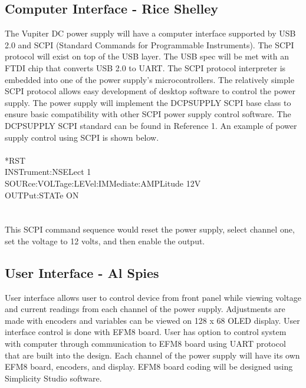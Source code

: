 \documentclass[15pt]{article}
\begin{document}
\subsection{Computer Interface - Rice Shelley}
The Vupiter DC power supply will have a computer interface supported by USB 2.0 and SCPI (Standard Commands for Programmable Instruments). The SCPI protocol will exist on top of the USB layer. The USB spec will be met with an FTDI chip that converts USB 2.0 to UART. The SCPI protocol interpreter is embedded into one of the power supply’s microcontrollers. The relatively simple SCPI protocol allows easy development of desktop software to control the power supply. The power supply will implement the DCPSUPPLY SCPI\cite{10} base class to ensure basic compatibility with other SCPI power supply control software. The DCPSUPPLY SCPI standard can be found in Reference 1. An example of power supply control using SCPI is shown below. \\
\\
*RST\\
INSTrument:NSELect 1\\
SOURce:VOLTage:LEVel:IMMediate:AMPLitude 12V\\
OUTPut:STATe ON\\
\\\\
This SCPI command sequence would reset the power supply, select channel one, set the voltage to 12 volts, and then enable the output. 


\subsection{User Interface - Al Spies}
User interface allows user to control device from front panel while viewing voltage and current readings from each channel of the power supply. Adjustments are made with encoders and variables can be viewed on 128 x 68 OLED display. User interface control is done with EFM8 board. User has option to control system with computer through communication to EFM8 board using UART protocol that are built into the design. Each channel of the power supply will have its own EFM8 board, encoders, and display. EFM8 board coding will be designed using Simplicity Studio software.\\
\end{document}
